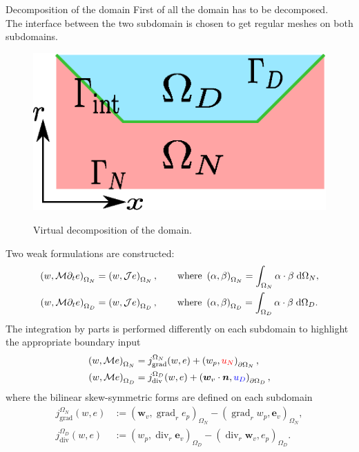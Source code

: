 \documentclass[aspectratio=169]{ISAE-Beamer}
\DeclareMathOperator*{\grad}{grad}
\renewcommand{\div}{\operatorname{div}}
\begin{document}
\begin{frame}{Decomposition of the domain}
First of all the domain has to be decomposed. \\

The interface between the two subdomain is chosen to get regular meshes on both subdomains.
\begin{figure}[t]%
	\centering
	\includegraphics[width=0.5\columnwidth]{domain_split.eps} \\
	\caption{Virtual decomposition of the domain.}
\end{figure}
\end{frame}

\begin{frame}
	Two weak formulations are constructed: 
	\begin{align*}
	\left(w, \mathcal{M} \partial_t{e} \right)_{\Omega_N} &= \left(w, \mathcal{J} e \right)_{\Omega_{N}}, \qquad \text{where } \left(\alpha, \beta \right)_{\Omega_N} = \int_{\Omega_{N}} \alpha \cdot \beta \d{\Omega_{N}}, \\
	\left(w, \mathcal{M} \partial_t{e} \right)_{\Omega_D} &= \left(w, \mathcal{J} e \right)_{\Omega_{D}}, \qquad \text{where } \left(\alpha, \beta \right)_{\Omega_D} = \int_{\Omega_{D}} \alpha \cdot \beta \d{\Omega_{D}}.
	\end{align*}
	The integration by parts is performed differently on each subdomain to highlight the appropriate boundary input
	\begin{equation*}
	\begin{aligned}
	\left(w, \mathcal{M} e \right)_{\Omega_{N}} &= j_{\text{grad}}^{\Omega_N}(w, e) + \left(w_p, \textcolor{red}{u_N} \right)_{\partial \Omega_N}, \\
	\left(w, \mathcal{M} e \right)_{\Omega_{D}} &= j_{\text{div}}^{\Omega_D}(w, e) + \left(\bm{w}_v \cdot \bm{n}, \textcolor{blue}{u_D} \right)_{\partial \Omega_D},  \\
	\end{aligned} 
	\end{equation*}
where the bilinear skew-symmetric forms are defined on each subdomain
\begin{equation*}
	\begin{aligned}
	j_{\text{grad}}^{\Omega_{N}}(w, e) &:= \left(\bm{w}_v, {\grad}_r e_p \right)_{\Omega_{N}} - \left({\grad}_r w_p, \bm{e}_v \right)_{\Omega_{N}}, \\
	j_{\text{div}}^{\Omega_{D}}(w, e) &:= \left(w_p, \div_r \bm{e}_v \right)_{\Omega_{D}} - \left(\div_r \bm{w}_v, e_p \right)_{\Omega_{D}}.
	\end{aligned}
\end{equation*}
\end{frame}
\end{document}
